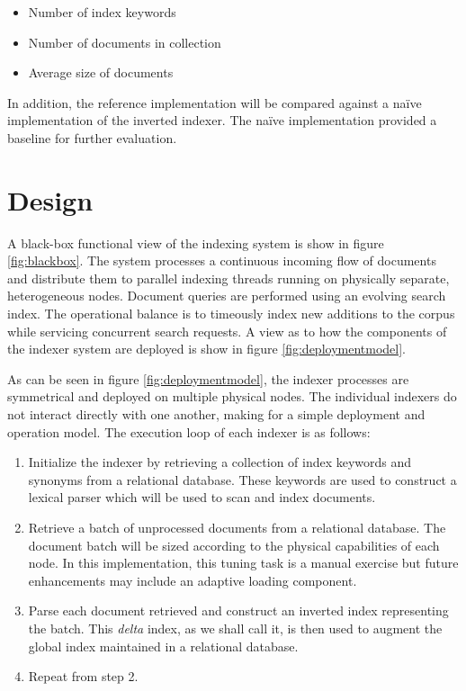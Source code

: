 \documentclass[10pt]{article}
\begin{document}
\begin{itemize}
  \item Number of index keywords
  \item Number of documents in collection
  \item Average size of documents
\end{itemize}

In addition, the reference implementation will be compared against a
naïve implementation of the inverted indexer. The naïve implementation
provided a baseline for further evaluation. 


\section{Design}
\label{sec:design}
A black-box functional view of the indexing system is show in figure
\ref{fig:blackbox}. The system processes a continuous incoming flow of
documents and distribute them to parallel indexing threads running on
physically separate, heterogeneous nodes.  Document queries are performed
using an evolving search index. The operational balance is to
timeously index new additions to the corpus while servicing concurrent
search requests. A view as to how the components of the indexer system
are deployed is show in figure \ref{fig:deploymentmodel}.

As can be seen in figure \ref{fig:deploymentmodel}, the indexer
processes are symmetrical and deployed on multiple physical nodes. The
individual indexers do not interact directly with one another, making
for a simple deployment and operation model. The execution loop of
each indexer is as follows:

\begin{enumerate}
\item Initialize the indexer by retrieving a collection of index
  keywords and synonyms from a relational database. These keywords are
  used to construct a lexical parser which will be used to scan and
  index documents.
\item Retrieve a batch of unprocessed documents from a relational
  database. The document batch will be sized according to the physical
  capabilities of each node. In this implementation, this tuning task
  is a manual exercise but future enhancements may include an adaptive
  loading component.
\item Parse each document retrieved and construct an inverted index
  representing the batch. This \textit{delta} index, as we shall call
  it, is then used to augment the global index maintained in a
  relational database.
\item Repeat from step 2.
\end{enumerate}
\end{document}
